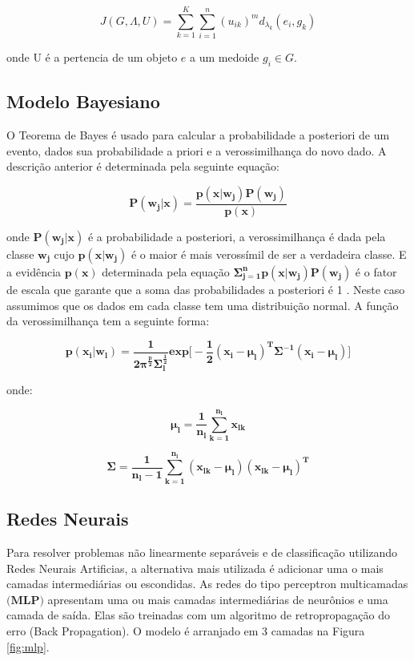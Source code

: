 \documentclass[12pt]{article}
\begin{document}
$$ J(G,\Lambda,U) = \sum_{k=1}^{K}\sum_{i=1}^{n} (u_{ik})^m d_{\lambda_{k}}(e_i,g_k) $$

onde U é a pertencia de um objeto $e$ a um medoide $ g_i \in G $.    

\subsection{Modelo Bayesiano}

O Teorema de Bayes é usado para calcular a probabilidade a posteriori de um evento, dados sua probabilidade a priori e a verossimilhança do novo dado. A descrição anterior é determinada pela seguinte equação:

\begin{equation}
\mathbf{P(w_j\vert x)= \dfrac{p(x\vert w_j) P(w_j)}{p(x)} }
\end{equation}

onde $\mathbf{P(w_j\vert x)}$ é a probabilidade a posteriori, a verossimilhança  é dada pela classe $\mathbf{w_j}$ cujo $\mathbf{p(x\vert w_j)}$ é o maior é mais verossímil de ser a verdadeira classe. E a evidência $\mathbf{p(x)}$ determinada pela equação $\mathbf{\Sigma_{j=1}^{n} p(x\vert w_j) P(w_j)}$ é o fator de escala que garante que a soma das probabilidades a posteriori é 1 \cite{duda2012pattern}. Neste caso assumimos que os dados em cada classe tem uma distribuição normal. A função da verossimilhança tem a seguinte forma: 

\begin{equation}
\mathbf{p(x_i\vert w_l)= \dfrac{1}{2\pi^\frac{p}{2}\Sigma_{l}^{\frac{1}{2}}}exp\Bigg[ -\frac{1}{2}(x_i- \mu_{l})^{T}\Sigma^{-1}(x_i-\mu_{l}) \Bigg ]  }
\end{equation}

onde:

\begin{equation}
\mathbf{\mu_{l} = \dfrac{1}{n_l} \sum_{k=1}^{n_l} x_{lk} }
\end{equation}

\begin{equation}
\mathbf{\Sigma = \dfrac{1}{n_l-1} \sum_{k=1}^{n_l} (x_{lk}-\mu_l) (x_{lk}-\mu_l)^T }
\end{equation}

\subsection{Redes Neurais}

Para resolver problemas não linearmente separáveis e de classificação utilizando Redes Neurais Artificias, a alternativa mais utilizada é adicionar uma o mais camadas intermediárias ou escondidas. As redes do tipo perceptron multicamadas $\textbf{(MLP)}$ apresentam uma ou mais camadas intermediárias de neurônios e uma camada de saída. Elas são treinadas com um algoritmo de retropropagação do erro (Back Propagation).
O modelo é arranjado em 3 camadas na Figura \ref{fig:mlp}.
\end{document}
